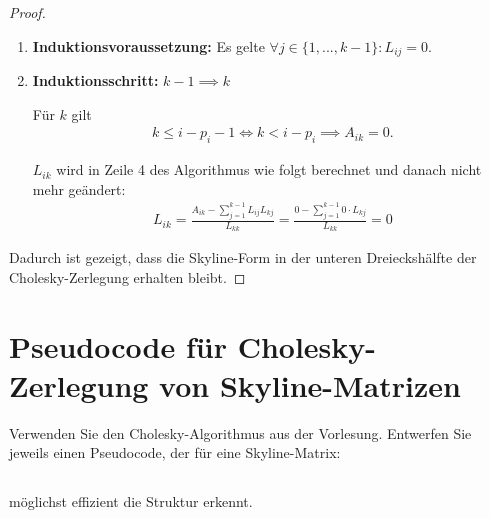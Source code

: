 \documentclass[titlepage]{article}
\begin{document}
\begin{proof}
\begin{enumerate}
		\item \textbf{Induktionsvoraussetzung:} Es gelte $\forall j \in \{1, ..., k - 1\}: L_{ij} = 0$.
		
		\item \textbf{Induktionsschritt:} $k-1 \implies k$
		
		Für $k$ gilt
		\begin{align*}
			k \leq i - p_i - 1 \iff k < i - p_i \implies A_{ik} = 0.
		\end{align*}
		
		$L_{ik}$ wird in Zeile 4 des Algorithmus wie folgt berechnet und danach nicht mehr geändert:
		\begin{align*}
			L_{ik} = \frac{A_{ik} - \sum_{j=1}^{k-1}L_{ij}L_{kj}}{L_{kk}} = \frac{0 - \sum_{j=1}^{k - 1}0\cdot L_{kj}}{L_{kk}} = 0
		\end{align*}
	\end{enumerate}
	
	Dadurch ist gezeigt, dass die Skyline-Form in der unteren Dreieckshälfte der Cholesky-Zerlegung erhalten bleibt.
\end{proof}
\newpage



\section{Pseudocode für Cholesky-Zerlegung von Skyline-Matrizen}
Verwenden Sie den Cholesky-Algorithmus aus der Vorlesung. Entwerfen Sie jeweils einen Pseudocode, der für eine Skyline-Matrix:


\subsection{}
möglichst effizient die Struktur erkennt.
\end{document}
